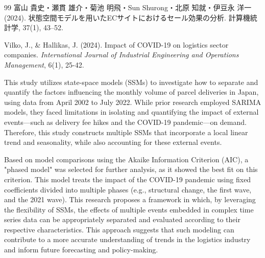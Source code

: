 \documentclass{bcsj}
\begin{document}
\begin{thebibliography}{99}
富山 貴史・瀬貫 雄介・菊池 明飛・Sun Shurong・北原 知就・伊豆永 洋一 (2024). 状態空間モデルを用いたECサイトにおけるセール効果の分析. 計算機統計学, 37(1), 43--52.


Vilko, J., \& Hallikas, J. (2024).
Impact of COVID-19 on logistics sector companies.
\textit{International Journal of Industrial Engineering and Operations Management}, 6(1), 25-42.


\end{thebibliography}

\begin{eabstract}
This study utilizes state-space models (SSMs) to investigate how to separate and quantify the factors
 influencing the monthly volume of parcel deliveries in Japan, using data from April 2002 to July 2022.
  While prior research employed SARIMA models, they faced limitations in isolating and quantifying the impact
   of external events—such as delivery fee hikes and the COVID-19 pandemic—on demand. Therefore,
    this study constructs multiple SSMs that incorporate a local linear trend and seasonality,
     while also accounting for these external events.

Based on model comparisons using the Akaike Information Criterion (AIC),
 a "phased model" was selected for further analysis, as it showed the best fit on this criterion.
  This model treats the impact of the COVID-19 pandemic using fixed coefficients
   divided into multiple phases (e.g., structural change, the first wave, and the 2021 wave).
    This research proposes a framework in which, by leveraging the flexibility of SSMs,
     the effects of multiple events embedded in complex time series data can be appropriately
      separated and evaluated according to their respective characteristics.
       This approach suggests that such modeling can contribute to a more accurate understanding
        of trends in the logistics industry and inform future forecasting and policy-making.
\end{eabstract}
\end{document}

